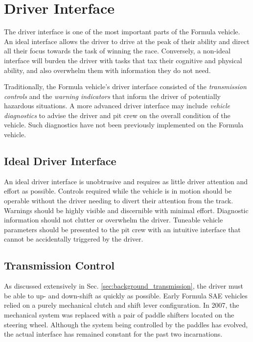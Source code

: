 \section{Driver Interface}

The driver interface is one of the most important parts of the Formula vehicle. An ideal interface allows the driver to drive at the peak of their ability and direct all their focus towards the task of winning the race. Conversely, a non-ideal interface will burden the driver with tasks that tax their cognitive and physical ability, and also overwhelm them with information they do not need.

Traditionally, the Formula vehicle's driver interface consisted of the \emph{transmission controls} and the \emph{warning indicators} that inform the driver of potentially hazardous situations. A more advanced driver interface may include \emph{vehicle diagnostics} to advise the driver and pit crew on the overall condition of the vehicle. Such diagnostics have not been previously implemented on the Formula vehicle.

\subsection{Ideal Driver Interface}

An ideal driver interface is unobtrusive and requires as little driver attention and effort as possible. Controls required while the vehicle is in motion should be operable without the driver needing to divert their attention from the track. Warnings should be highly visible and discernible with minimal effort. Diagnostic information should not clutter or overwhelm the driver. Tuneable vehicle parameters should be presented to the pit crew with an intuitive interface that cannot be accidentally triggered by the driver.

\subsection{Transmission Control}

As discussed extensively in Sec. \ref{sec:background_transmission}, the driver must be able to up- and down-shift as quickly as possible. Early Formula SAE vehicles relied on a purely mechanical clutch and shift lever configuration. In 2007, the mechanical system was replaced with a pair of paddle shifters located on the steering wheel. Although the system being controlled by the paddles has evolved, the actual interface has remained constant for the past two incarnations.

